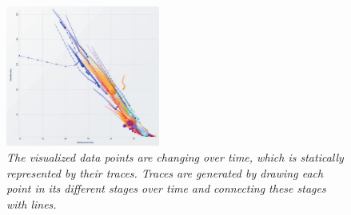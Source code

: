 \begin{figure}[H]
	\centering
	\includegraphics[width=0.45\textwidth]{figures/traces.png}
	\caption{\textit{The visualized data points are changing over time, which is statically represented by their traces. Traces are generated by drawing each point in its different stages over time and connecting these stages with lines. \cite{robertson2008effectiveness}}}
	\label{fig:traces}
\end{figure}